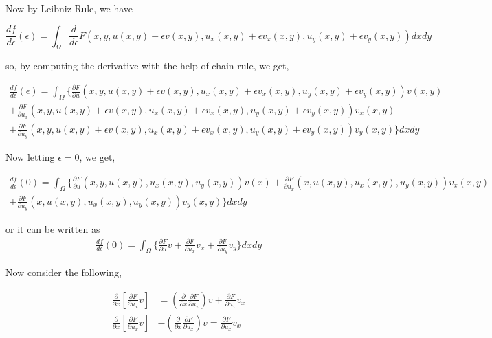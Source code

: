 \noindent Now by Leibniz Rule, we have

\begin{equation}
    \frac{df}{d\epsilon}(\epsilon) = \int_{\Omega} \frac{d}{d\epsilon}  F(x,y,u(x,y)+\epsilon v(x,y),u_x(x,y)+\epsilon v_x(x,y),u_y(x,y)+\epsilon v_y(x,y))dxdy
\end{equation}

\noindent so, by computing the derivative with the help of chain rule, we get,

\begin{align}
    \frac{df}{d\epsilon}(\epsilon) = \int_{\Omega} \Bigg\{ \frac{\partial F}{\partial u}(x,y,u(x,y)+\epsilon v(x,y),u_x(x,y)+\epsilon v_x(x,y),u_y(x,y)+\epsilon v_y(x,y))v(x,y) \nonumber \\
     + \frac{\partial F}{\partial u_x}(x,y,u(x,y)+\epsilon v(x,y),u_x(x,y)+\epsilon v_x(x,y),u_y(x,y)+\epsilon v_y(x,y))v_x(x,y) \nonumber \\
    + \frac{\partial F}{\partial u_y}(x,y,u(x,y)+\epsilon v(x,y),u_x(x,y)+\epsilon v_x(x,y),u_y(x,y)+\epsilon v_y(x,y))v_y(x,y)\Bigg\}  dxdy
\end{align}

\noindent Now letting $\epsilon = 0$, we get,

\begin{align}
    \frac{df}{d\epsilon}(0) = \int_{\Omega} \Bigg\{  \frac{\partial F}{\partial u}(x,y,u(x,y),u_x(x,y),u_y(x,y))v(x) + \frac{\partial F}{\partial u_x}(x,u(x,y),u_x(x,y),u_y(x,y))v_x(x,y)\nonumber \\+ \frac{\partial F}{\partial u_y}(x,u(x,y),u_x(x,y),u_y(x,y))v_y(x,y)   \Bigg\} dxdy
\end{align}

\noindent or it can be written as
\begin{align}\label{D_epsilon}
    \frac{df}{d\epsilon}(0) = \int_{\Omega} \Bigg\{  \frac{\partial F}{\partial u}v + \frac{\partial F}{\partial u_x}v_x+ \frac{\partial F}{\partial u_y}v_y   \Bigg\} dxdy
\end{align}


\noindent Now consider the following,

\begin{align}\label{P1term_2}
     \frac{\partial }{\partial x} \left [ \frac{\partial F}{\partial u_x}v \right]  & = \left(\frac{\partial }{\partial x} \frac{\partial F}{\partial u_x} \right) v + \frac{\partial F}{\partial u_x}v_x\nonumber\\
     \frac{\partial }{\partial x} \left [ \frac{\partial F}{\partial u_x}v \right]  & - \left(\frac{\partial }{\partial x} \frac{\partial F}{\partial u_x} \right) v = \frac{\partial F}{\partial u_x}v_x
\end{align}

